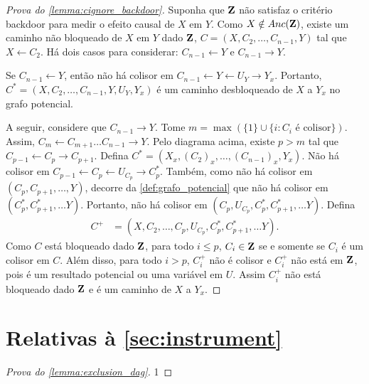 \begin{proof}[Prova do \cref{lemma:cignore_backdoor}]
 Suponha que ${\mathbf{Z}}$ não satisfaz 
 o critério backdoor para medir o efeito causal de $X$ em $Y$.
 Como $X \notin Anc({\mathbf{Z}})$, existe 
 um caminho não bloqueado de $X$ em $Y$ dado ${\mathbf{Z}}$,
 $C = (X, C_2, \ldots, C_{n-1}, Y)$ tal que
 $X \leftarrow C_2$.
 Há dois casos para considerar:
 $C_{n-1} \leftarrow Y$ e $C_{n-1} \rightarrow Y$.
 
 Se $C_{n-1} \leftarrow Y$, então
 não há colisor em 
 $C_{n-1} \leftarrow Y \leftarrow U_Y \rightarrow Y_x$.
 Portanto, $C^* = (X, C_2, \ldots, C_{n-1}, Y, U_Y, Y_x)$ é
 um caminho desbloqueado de $X$ a $Y_x$ no grafo potencial.
 
 A seguir, considere que $C_{n-1} \rightarrow Y$.
 Tome $m = \max(\{1\} \cup \{i: C_i \text{ é colisor} \})$. 
 Assim, $C_m \leftarrow C_{m+1} \ldots C_{n-1} \rightarrow Y$.
 Pelo diagrama acima, existe $p > m$ tal que 
 $C_{p-1} \leftarrow C_p \rightarrow C_{p+1}$.
 Defina $C^* = (X_x, (C_2)_x, \ldots, (C_{n-1})_x, Y_x)$.
 Não há colisor em 
 $C_{p-1} \leftarrow C_p \leftarrow U_{C_p} \rightarrow C^*_p$.
 Também, como não há colisor em $(C_p, C_{p+1}, \ldots, Y)$,
 decorre da \cref{def:grafo_potencial} que
 não há colisor em $(C^*_p, C^*_{p+1}, \ldots Y)$.
 Portanto, não há colisor em
 $(C_p, U_{C_p}, C^*_p, C^*_{p+1}, \ldots Y)$.
 Defina 
 \begin{align*}
  C^+ &= (X, C_2, \ldots, C_p, U_{C_p}, C^*_p, C^*_{p+1}, \ldots Y).
 \end{align*}
 Como $C$ está bloqueado dado ${\mathbf{Z}}$,
 para todo $i \leq p$, $C_i \in {\mathbf{Z}}$ 
 se e somente se $C_i$ é um colisor em $C$.
 Além disso, para todo $i > p$,
 $C^+_i$ não é colisor e 
 $C^+_i$ não está em ${\mathbf{Z}}$, pois
 é um resultado potencial ou uma variável em $U$.
 Assim $C^+_i$ não está bloqueado dado ${\mathbf{Z}}$ e
 é um caminho de $X$ a $Y_x$.
\end{proof}

\section{Relativas à \cref{sec:instrument}}

\begin{proof}[Prova do \cref{lemma:exclusion_dag}]
 1
\end{proof}



